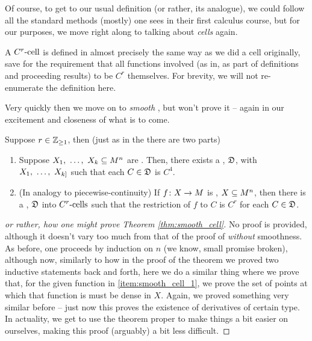 
Of course, to get to our usual definition (or rather, its analogue), we could follow all the standard methods (mostly) one sees in their first calculus course, but for our purposes, we move right along to talking about \emph{cells} again.

\begin{definition}[$C^r$-cells]
A $\Crcell[r]$ is defined in almost precisely the same way as we did a cell originally, save for the requirement that all functions involved (as in, as part of definitions and proceeding results) to be $C^r$ themselves. For brevity, we will not re-enumerate the definition here.
\end{definition}

Very quickly then we move on to \emph{smooth} \cd, but won't prove it -- again in our excitement and closeness of what is to come.

\begin{theorem}
  Suppose $r \in \Zgeq{1}$, then (just as in the \CDt there are two parts)
    \begin{enumerate}
      \item \label{item:smooth_cell_1} Suppose $\vonevm{X}{k} \subseteq M^n$ are . Then, there exists a \cd, $\fancyD$, \cmptble with $\vonevm{X}{k]}$ such that each $C \in \fancyD$ is $C^4$.

      \item \label{item:smooth_cell_2} (In analogy to piecewise-continuity) If $\funcdom{f}{X}{M}$ is , $\XMn[X]{n}$, then there is a \cd, $\fancyD$ into $\Crcells$ such that the restriction of $f$ to $C$ is $C^r$ for each $C \in \fancyD$.
    \end{enumerate}

  \label{thm:smooth_cell}
\end{theorem}

\begin{proof}[or rather, how one might prove Theorem \ref{thm:smooth_cell}]
  No proof is provided, although it doesn't vary too much from that of the proof of \CD \emph{without} smoothness. As before, one proceeds by induction on $n$ (we know, small promise broken), although now, similarly to how in the proof of the \CD theorem we proved two inductive statements back and forth, here we do a similar thing where we prove that, for the given function in \ref {item:smooth_cell_1}, we prove the set of points at which that function is \cont must be dense in $X$. Again, we proved something very similar before -- just now this proves the existence of derivatives of certain type. In actuality, we get to use the \CD theorem proper to make things a bit easier on ourselves, making this proof (arguably) a bit less difficult.
\end{proof}

